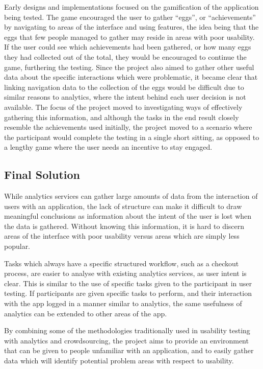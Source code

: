 Early designs and implementations focused on the gamification of the application
being tested. The game encouraged the user to gather ``eggs'', or ``achievements''
by navigating to areas of the interface and using features, the idea being that
the eggs that few people managed to gather may reside in areas with poor usability.
If the user could see which achievements had been gathered, or how many eggs
they had collected out of the total, they would be encouraged to continue the
game, furthering the testing.
Since the project also aimed to gather other useful data about the specific
interactions which were problematic, it became clear that linking navigation
data to the collection of the eggs would be difficult due to similar reasons
to analytics, where the intent behind each user decision is not available.
The focus of the project moved to investigating ways of effectively gathering
this information, and although the tasks in the end result closely resemble
the achievements used initially, the project moved to a scenario where the
participant would complete the testing in a single short sitting, as opposed
to a lengthy game where the user needs an incentive to stay engaged.

\subsection{Final Solution}

While analytics services can gather large amounts of data from the interaction
of users with an application, the lack of structure can make it difficult to
draw meaningful conclusions as information about the intent of the user is lost
when the data is gathered.  Without knowing this information, it is hard to
discern areas of the interface with poor usability versus areas which are
simply less popular.

Tasks which always have a specific structured workflow, such as a checkout
process, are easier to analyse with existing analytics services, as user intent
is clear. This is similar to the use of specific tasks given to the participant
in user testing. If participants are given specific tasks to perform, and their
interaction with the app logged in a manner similar to analytics, the same
usefulness of analytics can be extended to other areas of the app.

By combining some of the methodologies traditionally used in usability testing
with analytics and crowdsourcing, the project aims to provide an environment
that can be given to people unfamiliar with an application, and to easily
gather data which will identify potential problem areas with respect to
usability.

